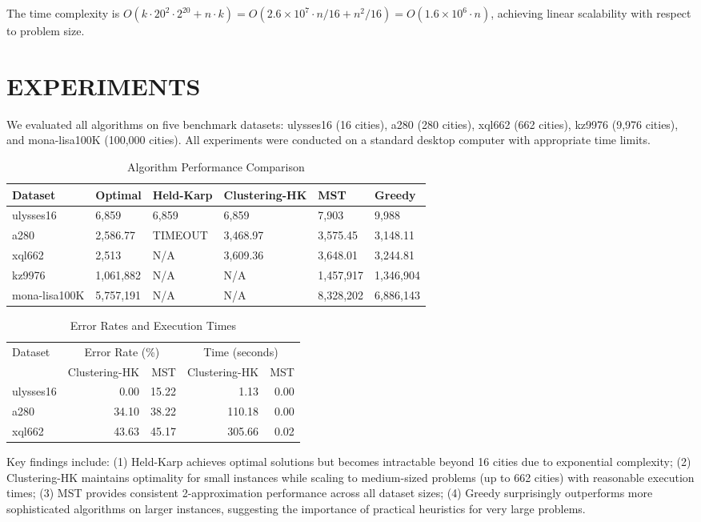 \documentclass[sigconf]{acmart}
\begin{document}
The time complexity is $O(k \cdot 20^2 \cdot 2^{20} + n \cdot k) = O(2.6 \times 10^7 \cdot n/16 + n^2/16) = O(1.6 \times 10^6 \cdot n)$, achieving linear scalability with respect to problem size.

\section{EXPERIMENTS}

We evaluated all algorithms on five benchmark datasets: ulysses16 (16 cities), a280 (280 cities), xql662 (662 cities), kz9976 (9,976 cities), and mona-lisa100K (100,000 cities). All experiments were conducted on a standard desktop computer with appropriate time limits.

\begin{table}[h]
\centering
\caption{Algorithm Performance Comparison}
\scriptsize
\begin{tabular}{p{1.5cm}p{1.2cm}p{1.2cm}p{1.2cm}p{1.2cm}p{1.2cm}}
\toprule
Dataset & Optimal & Held-Karp & Clustering-HK & MST & Greedy \\
\midrule
ulysses16 & 6,859 & 6,859 & 6,859 & 7,903 & 9,988 \\
a280 & 2,586.77 & TIMEOUT & 3,468.97 & 3,575.45 & 3,148.11 \\
xql662 & 2,513 & N/A & 3,609.36 & 3,648.01 & 3,244.81 \\
kz9976 & 1,061,882 & N/A & N/A & 1,457,917 & 1,346,904 \\
mona-lisa100K & 5,757,191 & N/A & N/A & 8,328,202 & 6,886,143 \\
\bottomrule
\end{tabular}
\end{table}

\begin{table}[h]
\centering
\caption{Error Rates and Execution Times}
\begin{tabular}{lrrrr}
\toprule
Dataset & \multicolumn{2}{c}{Error Rate (\%)} & \multicolumn{2}{c}{Time (seconds)} \\
& Clustering-HK & MST & Clustering-HK & MST \\
\midrule
ulysses16 & 0.00 & 15.22 & 1.13 & 0.00 \\
a280 & 34.10 & 38.22 & 110.18 & 0.00 \\
xql662 & 43.63 & 45.17 & 305.66 & 0.02 \\
\bottomrule
\end{tabular}
\end{table}

Key findings include: (1) Held-Karp achieves optimal solutions but becomes intractable beyond 16 cities due to exponential complexity; (2) Clustering-HK maintains optimality for small instances while scaling to medium-sized problems (up to 662 cities) with reasonable execution times; (3) MST provides consistent 2-approximation performance across all dataset sizes; (4) Greedy surprisingly outperforms more sophisticated algorithms on larger instances, suggesting the importance of practical heuristics for very large problems.
\end{document}
